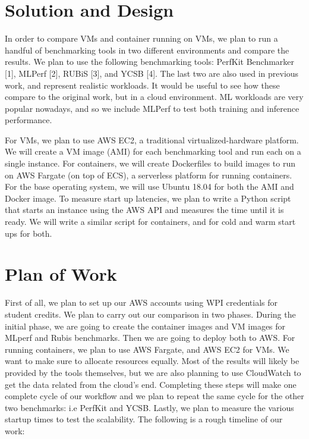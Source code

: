 \documentclass[11pt]{article}
\begin{document}
\section{Solution and Design}

In order to compare VMs and container running on VMs, we plan to run a handful of benchmarking tools in two different environments and compare the results. We plan to use the following benchmarking tools: PerfKit Benchmarker [1], MLPerf [2], RUBiS [3], and YCSB [4]. The last two are also used in previous work, and represent realistic workloads. It would be useful to see how these compare to the original work, but in a cloud environment. ML workloads are very popular nowadays, and so we include MLPerf to test both training and inference performance.

For VMs, we plan to use AWS EC2, a traditional virtualized-hardware platform. We will create a VM image (AMI) for each benchmarking tool and run each on a single instance.  For containers, we will create Dockerfiles to build images to run on AWS Fargate (on top of ECS), a serverless platform for running containers. For the base operating system, we will use Ubuntu 18.04 for both the AMI and Docker image. To measure start up latencies, we plan to write a Python script that starts an instance using the AWS API and measures the time until it is ready. We will write a similar script for containers, and for cold and warm start ups for both.

\section{Plan of Work}


First of all, we plan to set up our AWS accounts using WPI credentials for student credits. We plan to carry out our comparison in two phases. During the initial phase, we are going to create the container images and VM images for MLperf and Rubis benchmarks. Then we are going to deploy both to AWS. For running containers, we plan to use AWS Fargate, and AWS EC2 for VMs. We want to make sure to allocate resources equally. Most of the results will likely be provided by the tools themselves, but we are also planning to use CloudWatch to get the data related from the cloud's end. Completing these steps will make one complete cycle of our workflow and we plan to repeat the same cycle for the other two benchmarks: i.e PerfKit and YCSB. Lastly, we plan to measure the various startup times to test the scalability. The following is a rough timeline of our work:
\end{document}

